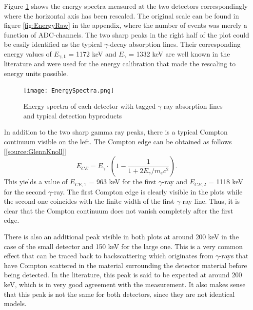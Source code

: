 \documentclass[a4paper,parskip,11pt, DIV12]{scrreprt}
\begin{document}
		Figure \ref{fig:EnergySpectra} shows the energy spectra measured at the two detectors correspondingly where the horizontal axis has been rescaled. The original scale can be found in figure \ref{fig:EnergyRaw} in the appendix, where the number of events was merely a function of ADC-channels. The two sharp peaks in the right half of the plot could be easily identified as the typical $\gamma$-decay absorption lines. Their corresponding energy values of $E_{\gamma,1}$ = 1172 keV and $E_{\gamma}$ = 1332 keV are well known in the literature and were used for the energy calibration that made the rescaling to energy units possible.	
		\begin{figure}[H]
\centering
\texttt{[image: EnergySpectra.png]}
\caption[EnergySpectra]{Energy spectra of each detector with tagged $\gamma$-ray absorption lines and typical detection byproducts}
\label{fig:EnergySpectra}
	\end{figure}	
		In addition to the two sharp gamma ray peaks, there is a typical Compton continuum visible on the left. The Compton edge can be obtained as follows [\ref{source:GlennKnoll}]
	\begin{equation}
E_{CE} = E_{\gamma} \cdot \left(1 - \frac{1}{1+2 E_{\gamma}/m_ec^2} \right).
\end{equation}
		This yields a value of $E_{CE,1}$ = 963 keV for the first $\gamma$-ray and $E_{CE,2}$ = 1118 keV for the second $\gamma$-ray. The first Compton edge is clearly visible in the plots while the second one coincides with the finite width of the first $\gamma$-ray line. Thus, it is clear that the Compton continuum does not vanish completely after the first edge.

		There is also an additional peak visible in both plots at around 200 keV in the case of the small detector and 150 keV for the large one. This is a very common effect that can be traced back to backscattering which originates from $\gamma$-rays that have Compton scattered in the material surrounding the detector material before being detected. In the literature, this peak is said to be expected at around 200 keV, which is in very good agreement with the measurement. It also makes sense that this peak is not the same for both detectors, since they are not identical models.
\end{document}
